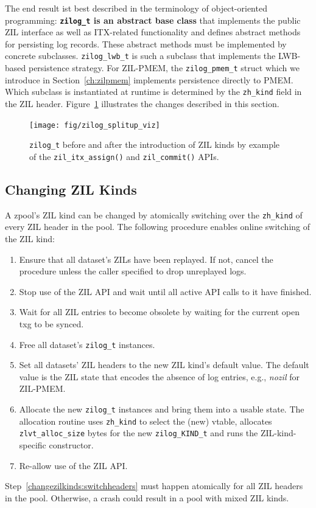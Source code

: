 \documentclass[12pt,a4paper,twoside]{book}
\begin{document}
The end result ist best described in the terminology of object-oriented programming:
\textbf{\lstinline{zilog_t} is an abstract base class} that implements the public ZIL interface as well as ITX-related functionality and defines abstract methods for persisting log records.
These abstract methods must be implemented by concrete subclasses.
\lstinline{zilog_lwb_t} is such a subclass that implements the LWB-based persistence strategy.
For ZIL-PMEM, the \lstinline{zilog_pmem_t} struct which we introduce in Section~\ref{ch:zilpmem} implements persistence directly to PMEM.
Which subclass is instantiated at runtime is determined by the \lstinline{zh_kind} field in the ZIL header.
Figure~\ref{fig:zilog_splitup_viz} illustrates the changes described in this section.

\begin{figure}[H]
    \centering
    \texttt{[image: fig/zilog\_splitup\_viz]}
    \caption{\lstinline{zilog_t} before and after the introduction of ZIL kinds by example of the \lstinline{zil_itx_assign()} and \lstinline{zil_commit()} APIs.}
    \label{fig:zilog_splitup_viz}
\end{figure}


\subsection{Changing ZIL Kinds}\label{sec:zil_kinds:change}
A zpool's ZIL kind can be changed by atomically switching over the \lstinline{zh_kind} of every ZIL header in the pool.
The following procedure enables online switching of the ZIL kind:
\begin{enumerate}[noitemsep]
    \item Ensure that all dataset's ZILs have been replayed. If not, cancel the procedure unless the caller specified to drop unreplayed logs.
    \item Stop use of the ZIL API and wait until all active API calls to it have finished.
    \item Wait for all ZIL entries to become obsolete by waiting for the current open txg to be synced.
    \item Free all dataset's \lstinline{zilog_t} instances.
    \item \label{changezilkinds:switchheaders} Set all datasets' ZIL headers to the new ZIL kind's default value.
        The default value is the ZIL state that encodes the absence of log entries, e.g., \textit{nozil} for ZIL-PMEM.
    \item Allocate the new \lstinline{zilog_t} instances and bring them into a usable state.
        The allocation routine uses \lstinline{zh_kind} to select the (new) vtable, allocates \lstinline{zlvt_alloc_size} bytes for the new \lstinline{zilog_KIND_t} and runs the ZIL-kind-specific constructor.
    \item Re-allow use of the ZIL API.
\end{enumerate}
Step~\ref{changezilkinds:switchheaders} must happen atomically for all ZIL headers in the pool.
Otherwise, a crash could result in a pool with mixed ZIL kinds.
\end{document}
